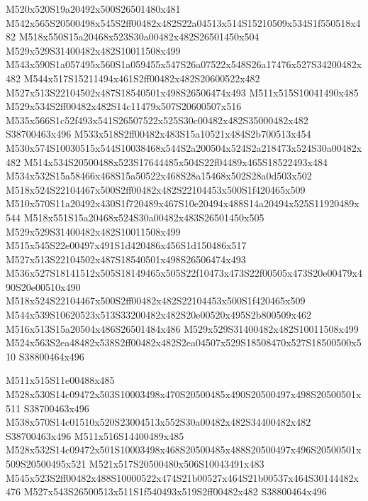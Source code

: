 \documentclass{article}
\begin{document}
\begin{multicols}{2}
M520x520S19a20492x500S26501480x481 M542x565S20500498x545S2ff00482x482S22a04513x514S15210509x534S1f550518x482 M518x550S15a20468x523S30a00482x482S26501450x504 M529x529S31400482x482S10011508x499 M543x590S1a057495x560S1a059455x547S26a07522x548S26a17476x527S34200482x482 M544x517S15211494x461S2ff00482x482S20600522x482 M527x513S22104502x487S18540501x498S26506474x493 M511x515S10041490x485 M529x534S2ff00482x482S14c11479x507S20600507x516 M535x566S1c52f493x541S26507522x525S30c00482x482S35000482x482 S38700463x496 M533x518S2ff00482x483S15a10521x484S2b700513x454 M530x574S10030515x544S10038468x544S2a200504x524S2a218473x524S30a00482x482 M514x534S20500488x523S17644485x504S22f04489x465S18522493x484 M534x532S15a58466x468S15a50522x468S28a15468x502S28a0d503x502 M518x524S22104467x500S2ff00482x482S22104453x500S1f420465x509 M510x570S11a20492x430S1f720489x467S10e20494x488S14a20494x525S11920489x544 M518x551S15a20468x524S30a00482x483S26501450x505 M529x529S31400482x482S10011508x499 M515x545S22e00497x491S1d420486x456S1d150486x517 M527x513S22104502x487S18540501x498S26506474x493 M536x527S18141512x505S18149465x505S22f10473x473S22f00505x473S20e00479x490S20e00510x490 M518x524S22104467x500S2ff00482x482S22104453x500S1f420465x509 M544x539S10620523x513S33200482x482S20e00520x495S2b800509x462 M516x513S15a20504x486S26501484x486 M529x529S31400482x482S10011508x499 M524x563S2ea48482x538S2ff00482x482S2ea04507x529S18508470x527S18500500x510 S38800464x496

M511x515S11e00488x485 M528x530S14c09472x503S10003498x470S20500485x490S20500497x498S20500501x511 S38700463x496 M538x570S14c01510x520S23004513x552S30a00482x482S34400482x482 S38700463x496 M511x516S14400489x485 M528x532S14c09472x501S10003498x468S20500485x488S20500497x496S20500501x509S20500495x521 M521x517S20500480x506S10043491x483 M545x523S2ff00482x488S10000522x474S21b00527x464S21b00537x464S30144482x476 M527x543S26500513x511S1f540493x519S2ff00482x482 S38800464x496


\end{multicols}
\end{document}
